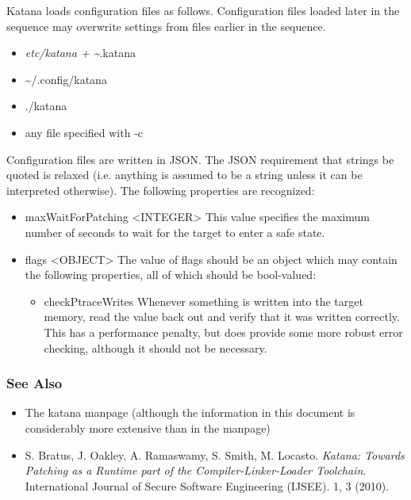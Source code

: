\documentclass[11pt]{article}
\begin{document}
    Katana loads configuration files as follows. Configuration files
    loaded later in the sequence may overwrite settings from files
    earlier in the sequence.
\begin{itemize}
\item \emph{etc/katana     + \~{}}.katana
\item \~{}/.config/katana
\item ./katana
\item any file specified with -c
\end{itemize}
    Configuration files are written in JSON. The JSON requirement that
    strings be quoted is relaxed (i.e. anything is assumed to be a
    string unless it can be interpreted otherwise). The following
    properties are recognized:
\begin{itemize}
\item maxWaitForPatching <INTEGER>
      This value specifies the maximum number of seconds to wait for
      the target to enter a safe state.
\item flags <OBJECT>
      The value of flags should be an object which may contain the
      following properties, all of which should be bool-valued:

\begin{itemize}
\item checkPtraceWrites
        Whenever something is written into the target memory, read the
        value back out and verify that it was written correctly. This
        has a performance penalty, but does provide some more robust
        error checking, although it should not be necessary.
\end{itemize}

\end{itemize}
\subsubsection{See Also}
\label{sec-3.5.9}

\begin{itemize}
\item The katana manpage (although the information in this document is
      considerably more extensive than in the manpage)
\item S. Bratus, J. Oakley, A. Ramaswamy, S. Smith,
      M. Locasto. \emph{Katana: Towards Patching as a Runtime part of the       Compiler-Linker-Loader Toolchain}. International Journal of
      Secure Software Engineering (IJSEE). 1, 3 (2010).
\end{itemize}
\end{document}
